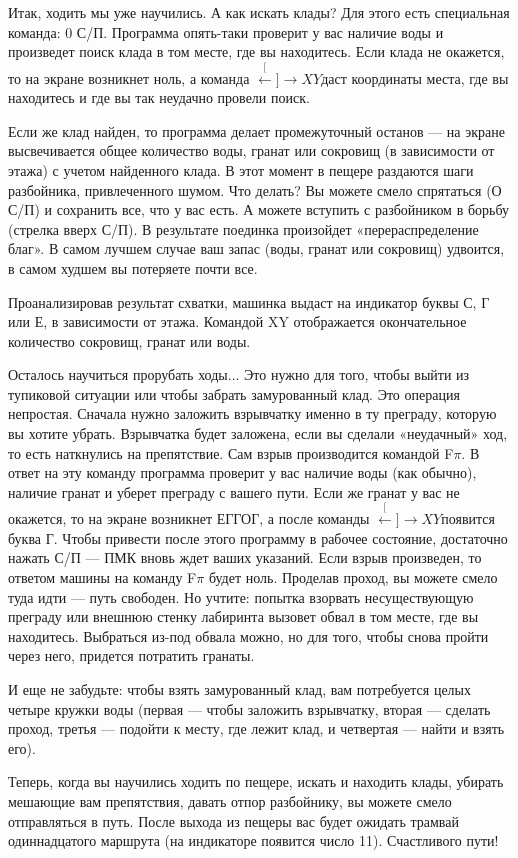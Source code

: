 \documentclass[11pt,a4paper,oneside]{article}
\def\XY{$\stackrel[\leftarrow]{\rightarrow}{XY}$}
\begin{document}
Итак, ходить мы уже научились. А как искать клады? Для этого есть специальная команда: 0 С/П. Программа опять-таки проверит у вас наличие воды и произведет поиск клада в том месте, где вы находитесь. Если клада не окажется, то на экране возникнет ноль, а команда \XY даст координаты места, где вы находитесь и где вы так неудачно провели поиск.

Если же клад найден, то программа делает промежуточный останов — на экране высвечивается общее количество воды, гранат или сокровищ (в зависимости от этажа) с учетом найденного клада. В этот момент в пещере раздаются шаги разбойника, привлеченного шумом. Что делать? Вы можете смело спрятаться (О С/П) и сохранить все, что у вас есть. А можете вступить с разбойником в борьбу (стрелка вверх С/П). В результате поединка произойдет «перераспределение благ». В самом лучшем случае ваш запас (воды, гранат или сокровищ) удвоится, в самом худшем вы потеряете почти все.

Проанализировав результат схватки, машинка выдаст на индикатор буквы С, Г или Е, в зависимости от этажа. Командой XY отображается окончательное количество сокровищ, гранат или воды.

Осталось научиться прорубать ходы... Это нужно для того, чтобы выйти из тупиковой ситуации или чтобы забрать замурованный клад. Это операция непростая. Сначала нужно заложить взрывчатку именно в ту преграду, которую вы хотите убрать. Взрывчатка будет заложена, если вы сделали «неудачный» ход, то есть наткнулись на препятствие. Сам взрыв производится командой F$\pi$. В ответ на эту команду программа проверит у вас наличие воды (как обычно), наличие гранат и уберет преграду с вашего пути. Если же гранат у вас не окажется, то на экране возникнет ЕГГОГ, а после команды \XY появится буква Г. Чтобы привести после этого программу в рабочее состояние, достаточно нажать С/П — ПМК вновь ждет ваших указаний. Если взрыв произведен, то ответом машины на команду F$\pi$ будет ноль. Проделав проход, вы можете смело туда идти — путь свободен. Но учтите: попытка взорвать несуществующую преграду или внешнюю стенку лабиринта вызовет обвал в том месте, где вы находитесь. Выбраться из-под обвала можно, но для того, чтобы снова пройти через него, придется потратить гранаты.

И еще не забудьте: чтобы взять замурованный клад, вам потребуется целых четыре кружки воды (первая — чтобы заложить взрывчатку, вторая — сделать проход, третья — подойти к месту, где лежит клад, и четвертая — найти и взять его).

Теперь, когда вы научились ходить по пещере, искать и находить клады, убирать мешающие вам препятствия, давать отпор разбойнику, вы можете смело отправляться в путь. После выхода из пещеры вас будет ожидать трамвай одиннадцатого маршрута (на индикаторе появится число 11). Счастливого пути!
\end{document}
